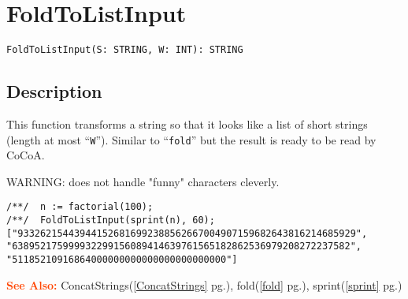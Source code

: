 \documentclass[a4paper]{mybook}
\newenvironment{command}{}{} %
\newcommand\SeeAlso{\par\textcolor{OrangeRed}{\textbf{\large See Also: }}}
\begin{document}
\section{FoldToListInput}
\label{FoldToListInput}
\begin{command} %


\begin{Verbatim}[label=syntax, rulecolor=\color{MidnightBlue},
frame=single]
FoldToListInput(S: STRING, W: INT): STRING
\end{Verbatim}


\subsection*{Description}

This function transforms a string so that it looks like a list
of short strings (length at most ``\verb&W&'').  Similar to ``\verb&fold&''
but the result is ready to be read by CoCoA.
\par 
WARNING: does not handle "funny" characters cleverly.
\begin{Verbatim}[label=example, rulecolor=\color{PineGreen}, frame=single]
/**/  n := factorial(100);
/**/  FoldToListInput(sprint(n), 60);
["933262154439441526816992388562667004907159682643816214685929",
"638952175999932299156089414639761565182862536979208272237582",
"51185210916864000000000000000000000000"]
\end{Verbatim}


\SeeAlso %
  ConcatStrings(\ref{ConcatStrings} pg.\pageref{ConcatStrings}), 
    fold(\ref{fold} pg.\pageref{fold}), 
    sprint(\ref{sprint} pg.\pageref{sprint})
\end{command} %
\end{document}
